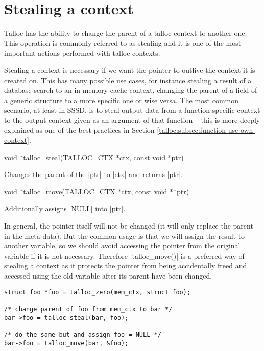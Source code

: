 \section{Stealing a context}
\label{talloc:stealing}

Talloc has the ability to change the parent of a talloc context to another
one. This operation is commonly referred to as stealing and it is one of
the most important actions performed with talloc contexts.

Stealing a context is necessary if we want the pointer to outlive the context it
is created on. This has many possible use cases, for instance stealing a result
of a database search to an in-memory cache context, changing the parent of a
field of a generic structure to a more specific one or wise versa. The most
common scenario, at least in SSSD, is to steal output data from a function-specific
context to the output context given as an argument of that function -- this is
more deeply explained as one of the best practices in Section 
\ref{talloc:subsec:function-use-own-context}.

\begin{funcproto}
void *talloc_steal(TALLOC_CTX *ctx, const void *ptr)
\end{funcproto}
\begin{funcdesc}
  Changes the parent of the |ptr| to |ctx| and returns |ptr|.
\end{funcdesc}
\begin{funcproto}
void *talloc_move(TALLOC_CTX *ctx, const void **ptr)
\end{funcproto}
\begin{funcdesc}
  Additionally assigns |NULL| into |ptr|.
\end{funcdesc}
\funclistend
In general, the pointer itself will not be changed (it will only replace the
parent in the meta data). But the common usage is that we will assign the
result to another variable, so we should avoid accessing the pointer from the
original variable if it is not necessary. Therefore |talloc_move()| is a
preferred way of stealing a context as it protects the pointer from being
accidentally freed and accessed using the old variable after its parent have
been changed.

\begin{lstlisting}
struct foo *foo = talloc_zero(mem_ctx, struct foo);

/* change parent of foo from mem_ctx to bar */
bar->foo = talloc_steal(bar, foo);

/* do the same but and assign foo = NULL */
bar->foo = talloc_move(bar, &foo);
\end{lstlisting}
